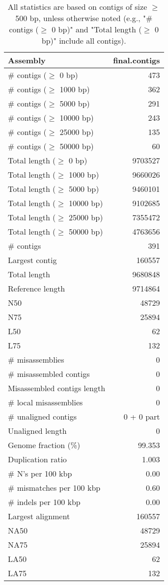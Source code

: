 \documentclass[12pt,a4paper]{article}
\begin{document}
\begin{table}[ht]
\begin{center}
\caption{All statistics are based on contigs of size $\geq$ 500 bp, unless otherwise noted (e.g., "\# contigs ($\geq$ 0 bp)" and "Total length ($\geq$ 0 bp)" include all contigs).}
\begin{tabular}{|l*{1}{|r}|}
\hline
Assembly & final.contigs \\ \hline
\# contigs ($\geq$ 0 bp) & 473 \\ \hline
\# contigs ($\geq$ 1000 bp) & 362 \\ \hline
\# contigs ($\geq$ 5000 bp) & 291 \\ \hline
\# contigs ($\geq$ 10000 bp) & 243 \\ \hline
\# contigs ($\geq$ 25000 bp) & 135 \\ \hline
\# contigs ($\geq$ 50000 bp) & 60 \\ \hline
Total length ($\geq$ 0 bp) & 9703527 \\ \hline
Total length ($\geq$ 1000 bp) & 9660026 \\ \hline
Total length ($\geq$ 5000 bp) & 9460101 \\ \hline
Total length ($\geq$ 10000 bp) & 9102685 \\ \hline
Total length ($\geq$ 25000 bp) & 7355472 \\ \hline
Total length ($\geq$ 50000 bp) & 4763656 \\ \hline
\# contigs & 391 \\ \hline
Largest contig & 160557 \\ \hline
Total length & 9680848 \\ \hline
Reference length & 9714864 \\ \hline
N50 & 48729 \\ \hline
N75 & 25894 \\ \hline
L50 & 62 \\ \hline
L75 & 132 \\ \hline
\# misassemblies & 0 \\ \hline
\# misassembled contigs & 0 \\ \hline
Misassembled contigs length & 0 \\ \hline
\# local misassemblies & 0 \\ \hline
\# unaligned contigs & 0 + 0 part \\ \hline
Unaligned length & 0 \\ \hline
Genome fraction (\%) & 99.353 \\ \hline
Duplication ratio & 1.003 \\ \hline
\# N's per 100 kbp & 0.00 \\ \hline
\# mismatches per 100 kbp & 0.60 \\ \hline
\# indels per 100 kbp & 0.00 \\ \hline
Largest alignment & 160557 \\ \hline
NA50 & 48729 \\ \hline
NA75 & 25894 \\ \hline
LA50 & 62 \\ \hline
LA75 & 132 \\ \hline
\end{tabular}
\end{center}
\end{table}
\end{document}
